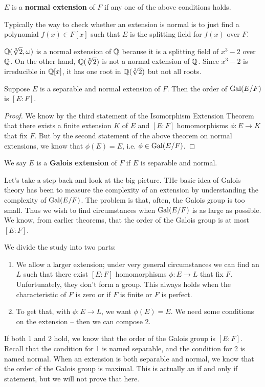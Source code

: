 \documentclass{../mathnotes}
\begin{document}
\begin{defn}
    $E$ is a \textbf{normal extension} of $F$ if any one of the above conditions holds.
\end{defn}

Typically the way to check whether an extension is normal is to just find a polynomial $f(x)\in F[x]$ such that $E$ is the
splitting field for $f(x)$ over $F$.

\begin{exmp}
    $\mathbb{Q}(\sqrt[3]{2},\omega)$ is a normal extension of $\mathbb{Q}$ because it is a splitting field of $x^3-2$ over $\mathbb{Q}$.
    On the other hand, $\mathbb{Q}(\sqrt[3]{2})$ is not a normal extension of $\mathbb{Q}$. Since $x^3-2$ is irreducible in $\mathbb{Q}[x]$,
    it has one root in $\mathbb{Q}(\sqrt[3]{2})$ but not all roots.
\end{exmp}

\begin{cor}
    Suppose $E$ is a separable and normal extension of $F$. Then the order of $\operatorname{Gal}(E/F)$ is $[E:F]$.
\end{cor}
\begin{proof}
    We know by the third statement of the Isomorphism Extension Theorem that there exists a finite extension $K$ of $E$
    and $[E:F]$ homomorphisms $\phi:E\to K$ that fix $F$. But by the second statement of the above theorem on normal extensions,
    we know that $\phi(E)=E$, i.e. $\phi\in\operatorname{Gal}(E/F)$.
\end{proof}

\begin{defn}
    We say $E$ is a \textbf{Galois extension} of $F$ if $E$ is separable and normal.
\end{defn}

Let's take a step back and look at the big picture. THe basic idea of Galois theory has been to measure the
complexity of an extension by understanding the complexity of $\operatorname{Gal}(E/F)$. The problem is that, often,
the Galois group is too small. Thus we wish to find circumstances when $\operatorname{Gal}(E/F)$ is as
large as possible. We know, from earlier theorems, that the order of the Galois group is at most
$[E:F]$.

We divide the study into two parts:
\begin{enumerate}
    \item We allow a larger extension; under very general circumstances we can find an $L$ such that
        there exist $[E:F]$ homomorphisms $\phi:E\to L$ that fix $F$. Unfortunately, they don't form a group.
        This always holds when the characteristic of $F$ is zero or if $F$ is finite or $F$ is perfect.
    \item To get that, with $\phi:E\to L$, we want $\phi(E)=E$. We need some conditions on the extension --
        then we can compose 2.
\end{enumerate}
If both 1 and 2 hold, we know that the order of the Galois group is $[E:F]$.
Recall that the condition for 1 is named separable, and the condition for 2 is named normal. When an extension
is both separable and normal, we know that the order of the Galois group is maximal. This is actually an if and only if
statement, but we will not prove that here.
\end{document}
